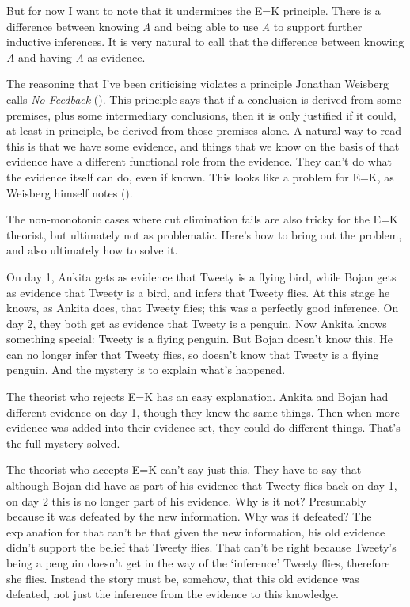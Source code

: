 \documentclass[
  12pt,
  letterpaper,
]{scrbook}
\begin{document}
But for now I want to note that it undermines the E=K principle. There
is a difference between knowing \emph{A} and being able to use \emph{A}
to support further inductive inferences. It is very natural to call that
the difference between knowing \emph{A} and having \emph{A} as evidence.

The reasoning that I've been criticising violates a principle Jonathan
Weisberg calls \emph{No Feedback} (). This principle says that if a conclusion is derived from
some premises, plus some intermediary conclusions, then it is only
justified if it could, at least in principle, be derived from those
premises alone. A natural way to read this is that we have some
evidence, and things that we know on the basis of that evidence have a
different functional role from the evidence. They can't do what the
evidence itself can do, even if known. This looks like a problem for
E=K, as Weisberg himself notes ().

The non-monotonic cases where cut elimination fails are also tricky for
the E=K theorist, but ultimately not as problematic. Here's how to bring
out the problem, and also ultimately how to solve it.

On day 1, Ankita gets as evidence that Tweety is a flying bird, while
Bojan gets as evidence that Tweety is a bird, and infers that Tweety
flies. At this stage he knows, as Ankita does, that Tweety flies; this
was a perfectly good inference. On day 2, they both get as evidence that
Tweety is a penguin. Now Ankita knows something special: Tweety is a
flying penguin. But Bojan doesn't know this. He can no longer infer that
Tweety flies, so doesn't know that Tweety is a flying penguin. And the
mystery is to explain what's happened.

The theorist who rejects E=K has an easy explanation. Ankita and Bojan
had different evidence on day 1, though they knew the same things. Then
when more evidence was added into their evidence set, they could do
different things. That's the full mystery solved.

The theorist who accepts E=K can't say just this. They have to say that
although Bojan did have as part of his evidence that Tweety flies back
on day 1, on day 2 this is no longer part of his evidence. Why is it
not? Presumably because it was defeated by the new information. Why was
it defeated? The explanation for that can't be that given the new
information, his old evidence didn't support the belief that Tweety
flies. That can't be right because Tweety's being a penguin doesn't get
in the way of the `inference' Tweety flies, therefore she flies. Instead
the story must be, somehow, that this old evidence was defeated, not
just the inference from the evidence to this knowledge.
\end{document}
